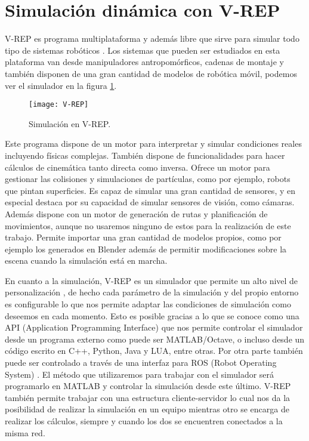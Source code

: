 \section{Simulación dinámica con V-REP}
%
%
%
V-REP es programa multiplataforma y además libre que sirve para simular todo tipo de sistemas robóticos \cite{_v-rep._2016}.
Los sistemas que pueden ser estudiados en esta plataforma van desde manipuladores antropomórficos, cadenas de montaje y también disponen de una gran cantidad de modelos de robótica móvil, podemos ver el simulador en la figura \ref{V-REP}.
\begin{figure}[ht!]
\centering
\texttt{[image: V-REP]}
\caption{Simulación en V-REP.} \label{V-REP}
\end{figure}
Este programa dispone de un motor para interpretar y simular condiciones reales incluyendo físicas complejas.
También dispone de funcionalidades para hacer cálculos de cinemática tanto directa como inversa.
Ofrece un motor para gestionar las colisiones y simulaciones de partículas, como por ejemplo, robots que pintan superficies.
Es capaz de simular una gran cantidad de sensores, y en especial destaca por su capacidad de simular sensores de visión, como cámaras.
Además dispone con un motor de generación de rutas y planificación de movimientos, aunque no usaremos ninguno de estos para la realización de este trabajo.
Permite importar una gran cantidad de modelos propios, como por ejemplo los generados en Blender además de permitir modificaciones sobre la escena cuando la simulación está en marcha.

En cuanto a la simulación, V-REP es un simulador que permite un alto nivel de personalización , de hecho cada parámetro de la simulación y del propio entorno es configurable lo que nos permite adaptar las condiciones de simulación como deseemos en cada momento.
Esto es posible gracias a lo que se conoce como una API (Application Programming Interface) que nos permite controlar el simulador desde un programa externo como puede ser MATLAB/Octave, o incluso desde un código escrito en C++, Python, Java y LUA, entre otras.
Por otra parte también puede ser controlado a través de una interfaz para ROS (Robot Operating System) \cite{_ros.org_2016}.
%
%
%
El método que utilizaremos para trabajar con el simulador será programarlo en MATLAB y controlar la simulación desde este último.
V-REP también permite trabajar con una estructura cliente-servidor lo cual nos da la posibilidad de realizar la simulación en un equipo mientras otro se encarga de realizar los cálculos, siempre y cuando los dos se encuentren conectados a la misma red.
%
%
%

